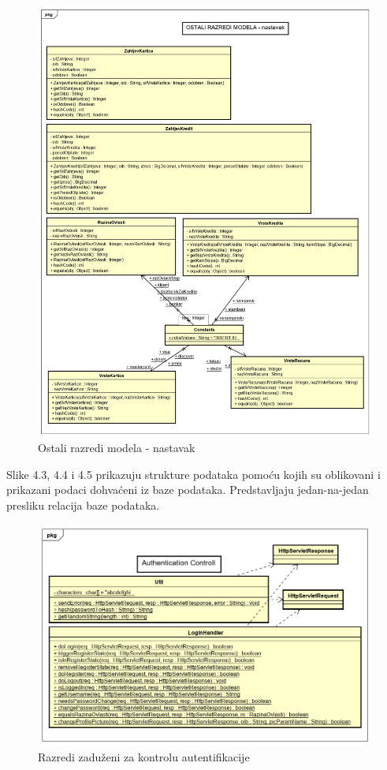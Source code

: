 			\begin{figure}[H]
				\includegraphics[scale=0.45]{Slike/Class Diagram2.PNG}
				\centering
				\caption{Ostali razredi modela - nastavak}
				\label{fig:dijagram}
			\end{figure}
		
		Slike 4.3, 4.4 i 4.5 prikazuju strukture podataka pomoću kojih su oblikovani i prikazani podaci dohvaćeni iz baze podataka. Predstavljaju jedan-na-jedan presliku relacija baze podataka.
		
			\begin{figure}[H]
				\includegraphics[scale=0.6]{Slike/Class Diagram3.PNG}
				\centering
				\caption{Razredi zaduženi za kontrolu autentifikacije}
				\label{fig:dijagram}
			\end{figure}
		
